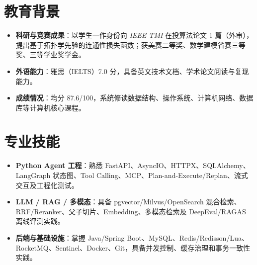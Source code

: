 \documentclass{resume}
\begin{document}

\noindent
{}

\vspace{-1.0em}

\section{教育背景}
\begin{itemize}[parsep=0.5ex]
    \item \textbf{科研与竞赛成果}：以学生一作身份向 \textit{IEEE TMI} 在投算法论文 1 篇（外审），提出基于拓扑学先验的连通性损失函数；获美赛二等奖、数学建模省赛三等奖、三等学业奖学金。
    \item \textbf{外语能力}：雅思（IELTS）7.0 分，具备英文技术文档、学术论文阅读与复现能力。
    \item \textbf{成绩情况}：均分 87.6/100，系统修读数据结构、操作系统、计算机网络、数据库等计算机核心课程。
\end{itemize}

\section{专业技能}
\begin{itemize}[parsep=0.5ex]
    \item \textbf{Python Agent 工程}：熟悉 FastAPI、AsyncIO、HTTPX、SQLAlchemy、LangGraph 状态图、Tool Calling、MCP、Plan-and-Execute/Replan、流式交互及工程化测试。
    \item \textbf{LLM / RAG / 多模态}：具备 pgvector/Milvus/OpenSearch 混合检索、RRF/Reranker、父子切片、Embedding、多模态检索及 DeepEval/RAGAS 离线评测实践。
    \item \textbf{后端与基础设施}：掌握 Java/Spring Boot、MySQL、Redis/Redisson/Lua、RocketMQ、Sentinel、Docker、Git，具备并发控制、缓存治理和事务一致性实践。
\end{itemize}
\end{document}
